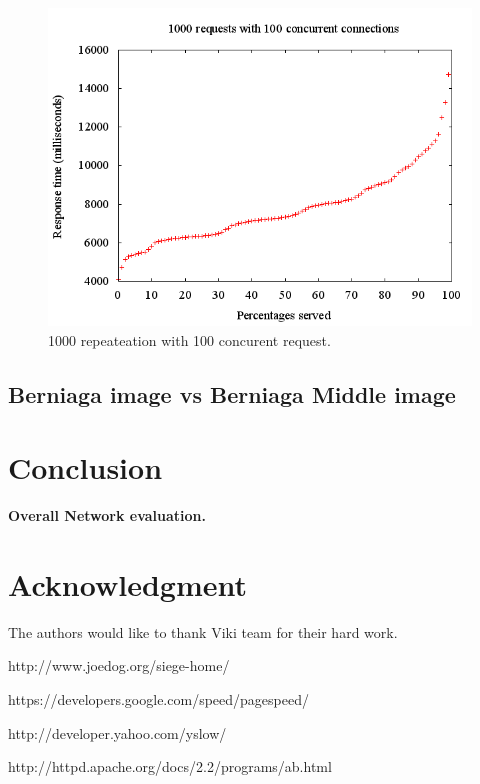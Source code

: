 \documentclass[conference]{/Users/kamol/Dropbox/PhD/papers/IEEEtran2/IEEEtran}
\begin{document}
\begin{figure}[ht]
\begin{minipage}[b]{\linewidth}\centering
\includegraphics[width=\textwidth]{include/gnu/1000_100.png}
\end{minipage}
\caption{1000 repeateation with 100 concurent request.}
\label{fig:my_read_latency}
\end{figure}


\subsection{Berniaga image vs Berniaga Middle image}


\section{Conclusion} 
{\bf Overall Network evaluation.}

\section{Acknowledgment}
The authors would like to thank Viki team for their hard work.

\begin{thebibliography}{1}

http://www.joedog.org/siege-home/

https://developers.google.com/speed/pagespeed/

http://developer.yahoo.com/yslow/


http://httpd.apache.org/docs/2.2/programs/ab.html

\end{thebibliography}
\end{document}
